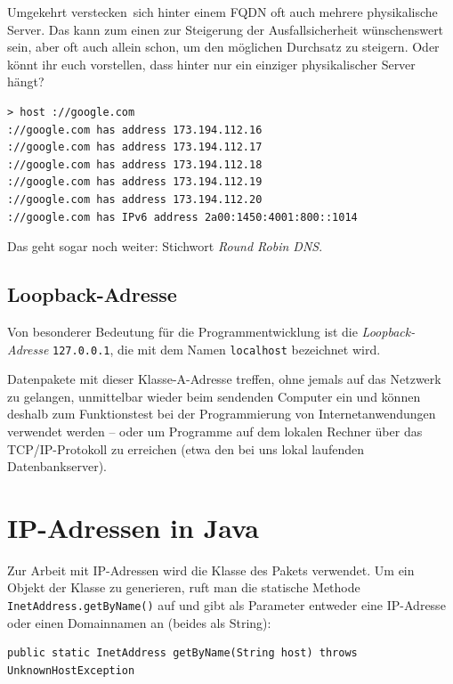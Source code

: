Umgekehrt \glqq verstecken\grqq\ sich hinter einem FQDN oft auch mehrere physikalische
Server. Das kann zum einen zur Steigerung der Ausfallsicherheit wünschenswert
sein, aber oft auch allein schon, um den möglichen Durchsatz zu steigern. Oder
könnt ihr euch vorstellen, dass hinter  nur ein
einziger physikalischer Server hängt?

\begin{lstlisting}
> host ://google.com
://google.com has address 173.194.112.16
://google.com has address 173.194.112.17
://google.com has address 173.194.112.18
://google.com has address 173.194.112.19
://google.com has address 173.194.112.20
://google.com has IPv6 address 2a00:1450:4001:800::1014
\end{lstlisting}

Das geht sogar noch weiter: Stichwort \emph{Round Robin DNS}.


\subsection{Loopback-Adresse}

Von besonderer Bedeutung für die Programmentwicklung ist die
\emph{Loopback-Adresse} \lstinline|127.0.0.1|, die mit dem Namen
\lstinline|localhost| bezeichnet wird.

Datenpakete mit dieser Klasse-A-Adresse treffen, ohne jemals auf das Netzwerk
zu gelangen, unmittelbar wieder beim sendenden Computer ein und können deshalb
zum Funktionstest bei der Programmierung von Internetanwendungen verwendet
werden -- oder um Programme auf dem lokalen Rechner über das TCP/IP-Protokoll zu
erreichen (etwa den bei uns lokal laufenden Datenbankserver).


\section{IP-Adressen in Java \tagLK}

Zur Arbeit mit IP-Adressen wird die Klasse  des Pakets
 verwendet. Um ein Objekt der Klasse 
zu generieren, ruft man die statische Methode
\lstinline|InetAddress.getByName()| auf und gibt als Parameter entweder eine
IP-Adresse oder einen Domainnamen an (beides als String):

\begin{lstlisting}
public static InetAddress getByName(String host) throws UnknownHostException
\end{lstlisting}


